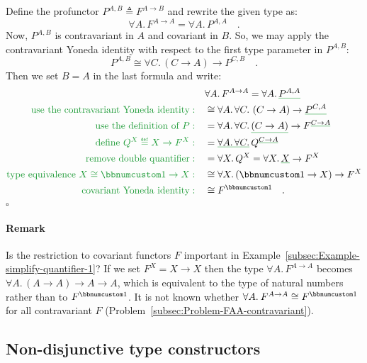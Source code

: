 Define the profunctor $P^{A,B}\triangleq F^{A\rightarrow B}$ and
rewrite the given type as:
\[
\forall A.\,F^{A\rightarrow A}=\forall A.\,P^{A,A}\quad.
\]
Now, $P^{A,B}$ is contravariant in $A$ and covariant in $B$. So,
we may apply the contravariant Yoneda identity with respect to the
first type parameter in $P^{A,B}$:
\[
P^{A,B}\cong\forall C.\,(C\rightarrow A)\rightarrow P^{C,B}\quad.
\]
Then we set $B=A$ in the last formula and write:
\begin{align*}
 & \forall A.\,F^{A\rightarrow A}=\forall A.\,\gunderline{P^{A,A}}\\
{\color{greenunder}\text{use the contravariant Yoneda identity}:}\quad & \cong\forall A.\,\forall C.\,\left(C\rightarrow A\right)\rightarrow\gunderline{P^{C,A}}\\
{\color{greenunder}\text{use the definition of }P:}\quad & =\forall A.\,\forall C.\,\gunderline{\left(C\rightarrow A\right)}\rightarrow F^{\gunderline{C\rightarrow A}}\\
{\color{greenunder}\text{define }Q^{X}\triangleq X\rightarrow F^{X}:}\quad & =\gunderline{\forall A.\,\forall C.}\,Q^{\gunderline{C\rightarrow A}}\\
{\color{greenunder}\text{remove double quantifier}:}\quad & =\forall X.\,Q^{X}=\forall X.\,\gunderline X\rightarrow F^{X}\\
{\color{greenunder}\text{type equivalence }X\cong\bbnum 1\rightarrow X:}\quad & \cong\forall X.\,(\bbnum 1\rightarrow X)\rightarrow F^{X}\\
{\color{greenunder}\text{covariant Yoneda identity}:}\quad & \cong F^{\bbnum 1}\quad.
\end{align*}
$\square$

\paragraph{Remark}

Is the restriction to covariant functors $F$ important in Example~\ref{subsec:Example-simplify-quantifier-1}?
If we set $F^{X}=X\rightarrow X$ then the type $\forall A.\,F^{A\rightarrow A}$
becomes $\forall A.\,(A\rightarrow A)\rightarrow A\rightarrow A$,
which is equivalent to the type of natural numbers rather than to
$F^{\bbnum 1}$. It is not known whether $\forall A.\:F^{A\rightarrow A}\cong F^{\bbnum 1}$
for all contravariant $F$ (Problem~\ref{subsec:Problem-FAA-contravariant}).

\subsection{Non-disjunctive type constructors}

